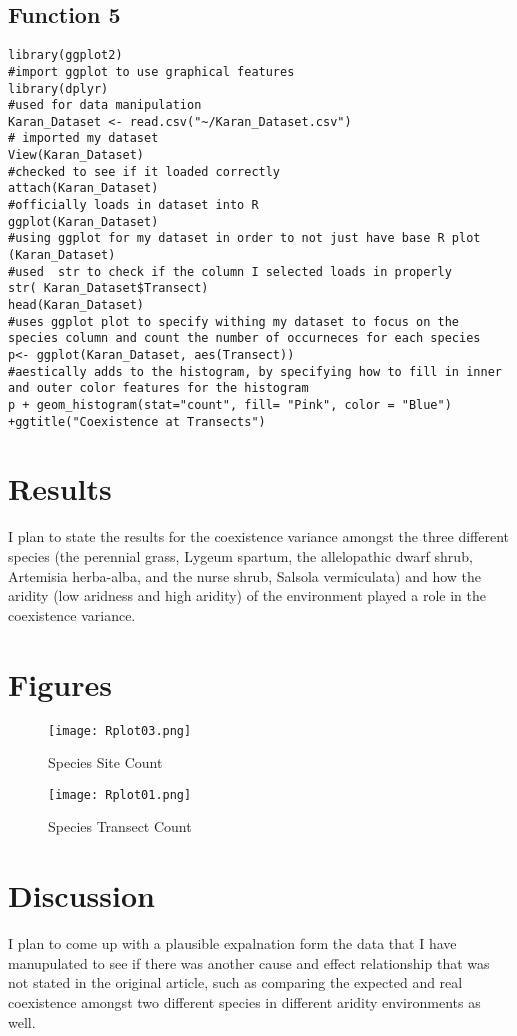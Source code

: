 \documentclass[letterpaper]{article}
\begin{document}
\subsection{Function 5}
\begin{verbatim}
library(ggplot2)
#import ggplot to use graphical features
library(dplyr)
#used for data manipulation
Karan_Dataset <- read.csv("~/Karan_Dataset.csv")
# imported my dataset
View(Karan_Dataset)
#checked to see if it loaded correctly
attach(Karan_Dataset)
#officially loads in dataset into R
ggplot(Karan_Dataset)
#using ggplot for my dataset in order to not just have base R plot
(Karan_Dataset)
#used  str to check if the column I selected loads in properly
str( Karan_Dataset$Transect)
head(Karan_Dataset)
#uses ggplot plot to specify withing my dataset to focus on the species column and count the number of occurneces for each species
p<- ggplot(Karan_Dataset, aes(Transect))
#aestically adds to the histogram, by specifying how to fill in inner and outer color features for the histogram
p + geom_histogram(stat="count", fill= "Pink", color = "Blue") +ggtitle("Coexistence at Transects")
\end{verbatim}

\section{Results}
I plan to state the results for the coexistence variance amongst the three different species (the perennial grass, Lygeum
spartum, the allelopathic dwarf shrub, Artemisia herba-alba, and the nurse shrub, Salsola vermiculata) and how the aridity (low aridness and high aridity)  of the environment played a role in the coexistence variance.

\newpage
\section{Figures}

\begin{figure}[h]
	\caption{Species Site  Count\label{fig: Plot}}
	\centering
	\texttt{[image: Rplot03.png]}
\end{figure} 

\newpage
\begin{figure}[h]
\caption{Species Transect Count\label{fig: Plot}}
	\centering
	\texttt{[image: Rplot01.png]}
\end{figure}


\newpage
\section{Discussion}
I plan to come up with a plausible expalnation form the data that I have manupulated to see if there was another cause and effect relationship that was not stated in the original article, such as comparing the expected and real coexistence amongst two different species in different aridity environments as well.
\end{document}

